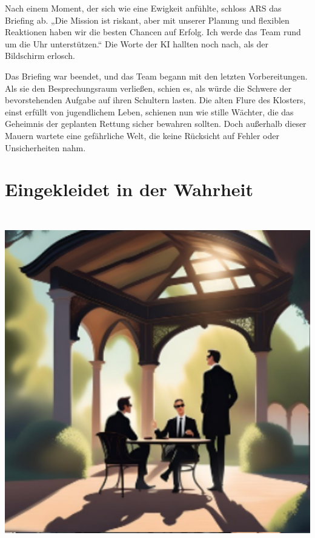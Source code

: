 \documentclass[
]{article}
\begin{document}
Nach einem Moment, der sich wie eine Ewigkeit anfühlte, schloss ARS das
Briefing ab. „Die Mission ist riskant, aber mit unserer Planung und
flexiblen Reaktionen haben wir die besten Chancen auf Erfolg. Ich werde
das Team rund um die Uhr unterstützen.`` Die Worte der KI hallten noch
nach, als der Bildschirm erlosch.

Das Briefing war beendet, und das Team begann mit den letzten
Vorbereitungen. Als sie den Besprechungsraum verließen, schien es, als
würde die Schwere der bevorstehenden Aufgabe auf ihren Schultern lasten.
Die alten Flure des Klosters, einst erfüllt von jugendlichem Leben,
schienen nun wie stille Wächter, die das Geheimnis der geplanten Rettung
sicher bewahren sollten. Doch außerhalb dieser Mauern wartete eine
gefährliche Welt, die keine Rücksicht auf Fehler oder Unsicherheiten
nahm.

\section{Eingekleidet in der
Wahrheit}\label{eingekleidet-in-der-wahrheit}

\includegraphics[width=5.88542in,height=5.79167in]{media/image4.png}
\end{document}
